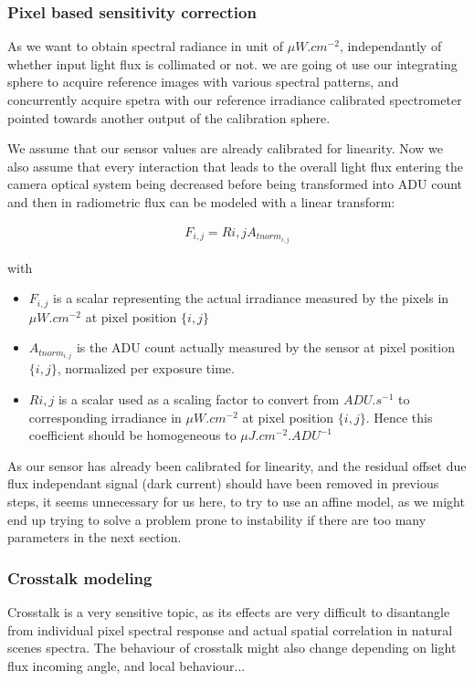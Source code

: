 \documentclass{article}
\begin{document}
    
    \subsubsection{Pixel based sensitivity correction}
    As we want to obtain spectral radiance in unit of $\mu W . cm^{-2}$, independantly of whether input light flux is collimated or not. we are going ot use our integrating sphere to acquire reference images with various spectral patterns, and concurrently acquire spetra with our reference irradiance calibrated spectrometer pointed towards another output of the calibration sphere.
    
    We assume that our sensor values are already calibrated for linearity. Now we also assume that every interaction that leads to the overall light flux entering the camera optical system being decreased before being transformed into ADU count and then in radiometric flux can be modeled with a linear transform:
    
    \begin{align*}
     F_{i,j} = R{i,j} A_{tnorm_{i,j}}
    \end{align*}
    
    with
    \begin{itemize}
     \item $F_{i,j}$ is a scalar representing the actual irradiance measured by the pixels in $\mu W . cm^{-2}$ at pixel position $\{i,j\}$
     \item $A_{tnorm_{i,j}}$ is the ADU count actually measured by the sensor at pixel position $\{i,j\}$, normalized per exposure time.
     \item $R{i,j}$ is a scalar used as a scaling factor to convert from $ADU.s^{-1}$ to corresponding irradiance in $\mu W . cm^{-2}$ at pixel position $\{i,j\}$. Hence this coefficient should be homogeneous to $\mu J . cm^{-2} . ADU^{-1}$
    \end{itemize}

    As our sensor has already been calibrated for linearity, and the residual offset due flux independant signal (dark current) should have been removed in previous steps, it seems unnecessary for us here, to try to use an affine model, as we might end up trying to solve a problem prone to instability if there are too many parameters in the next section.

    \subsubsection{Crosstalk modeling}
    Crosstalk is a very sensitive topic, as its effects are very difficult to disantangle from individual pixel spectral response and actual spatial correlation in natural scenes spectra. The behaviour of crosstalk might also change depending on light flux incoming angle, and local behaviour...
    
\end{document}
